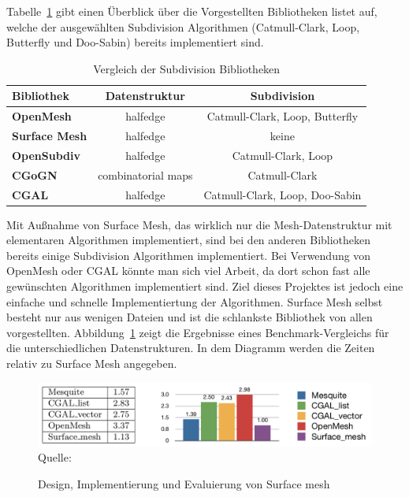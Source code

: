 Tabelle~\ref{tab:sd_bib} gibt einen Überblick über die Vorgestellten Bibliotheken listet auf, welche der ausgewählten Subdivision Algorithmen
(Catmull-Clark, Loop, Butterfly und Doo-Sabin) bereits implementiert sind.

\begin{table}[h]
\caption{Vergleich der Subdivision Bibliotheken}
\center
\begin{tabular}{|l|c|c|}
\toprule
\textbf{Bibliothek} & \textbf{Datenstruktur} & \textbf{Subdivision}\\
\midrule
\textbf{OpenMesh} & halfedge & Catmull-Clark, Loop, Butterfly\\
\textbf{Surface Mesh} & halfedge & keine\\
\textbf{OpenSubdiv} & halfedge & Catmull-Clark, Loop\\
\textbf{CGoGN} & combinatorial maps & Catmull-Clark\\
\textbf{\acs{CGAL}} & halfedge & Catmull-Clark, Loop, Doo-Sabin\\
\bottomrule
\end{tabular}
\label{tab:sd_bib}
\end{table}

Mit Außnahme von Surface Mesh, das wirklich nur die Mesh-Datenstruktur mit elementaren Algorithmen implementiert, sind bei den anderen Bibliotheken bereits
einige Subdivision Algorithmen implementiert.
Bei Verwendung von OpenMesh oder CGAL könnte man sich viel Arbeit, da dort schon fast alle gewünschten Algorithmen implementiert sind.
Ziel dieses Projektes ist jedoch eine einfache und schnelle Implementiertung der Algorithmen.
Surface Mesh selbst besteht nur aus wenigen Dateien und ist die schlankste Bibliothek von allen vorgestellten.
Abbildung~\ref{fig:surface_mesh_cmp} zeigt die Ergebnisse eines Benchmark-Vergleichs für die unterschiedlichen Datenstrukturen.
In dem Diagramm werden die Zeiten relativ zu Surface Mesh angegeben.

\begin{figure}[h]
  \caption{Design, Implementierung und Evaluierung von Surface mesh}
  \centering
  \includegraphics[width=1.0\textwidth]{content/media/surface_mesh_cmp}
  \\Quelle: \cite{Sieger.}
  \label{fig:surface_mesh_cmp}
\end{figure}

